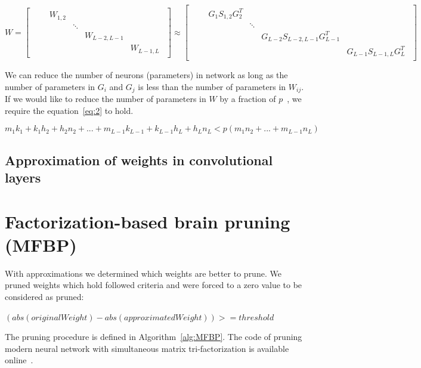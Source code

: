 \documentclass{article} %
\begin{document}
\begin{equation} \label{eq:1}
W = 
\begin{bmatrix} 
\begin{smallmatrix}
& &W_{1,2} & & & \\
& & &\ddots & & \\ 
& & & &W_{L-2,L-1} & \\ 
& & & & &W_{L-1,L} 
\end{smallmatrix}
\end{bmatrix} 
\approx 
\begin{bmatrix} 
\begin{smallmatrix}
& &G_1S_{1,2}G_2^T & & & \\ 
& & &\ddots & & \\ 
& & & &G_{L-2}S_{L-2,L-1}G_{L-1}^T & \\ 
& & & & &G_{L-1}S_{L-1,L}G_L^T 
\end{smallmatrix}
\end{bmatrix}
\end{equation}


We can reduce
the number of neurons (parameters) in network as long as the number of 
parameters
in $G_i$ and $G_j$ is less than the number of parameters in $W_{ij}$. If we 
would
like to reduce the number of parameters in $W$ by a fraction of
$p$~\cite{sainath2013low}, we require the equation~\ref{eq:2} to hold.

\begin{equation} \label{eq:2}
 m_1k_1 + k_1h_2 + h_2n_2 + ... + m_{L-1}k_{L-1} + k_{L-1}h_L + h_Ln_L < 
p(m_1n_2 + ... + m_{L-1}n_L)
\end{equation}

\subsection{Approximation of weights in convolutional layers}

\section{Factorization-based brain pruning (MFBP)}
With approximations we determined which weights are better to prune. We pruned
weights which hold followed criteria and were forced to a zero value to be
considered as pruned:

$(abs(originalWeight) - abs(approximatedWeight)) >= threshold$


The pruning procedure is defined in Algorithm~\ref{alg:MFBP}.
The code of pruning modern neural network with simultaneous matrix 
tri-factorization is available online~\cite{code}.
\end{document}

